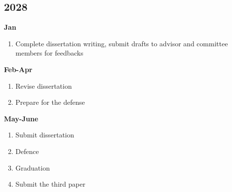 \documentclass[12pt,letter]{article}
\begin{document}
\begin{multicols}{2}
\subsection{2028}
\textbf{Jan}
\begin{enumerate}
	\item Complete dissertation writing, submit drafts to advisor and committee members for feedbacks
	\end{enumerate}	
\textbf{Feb-Apr}
\begin{enumerate}
	\item Revise dissertation
	\item Prepare for the defense
	\end{enumerate}	
\textbf{May-June}
\begin{enumerate}
	\item Submit dissertation
	\item Defence
	\item Graduation
	\item Submit the third paper
	\end{enumerate}
	\end{multicols}	
\end{document}
